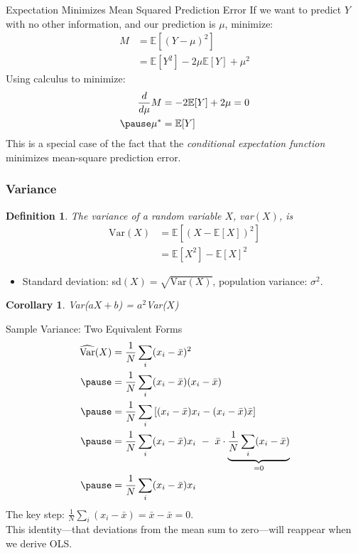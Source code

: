 \documentclass[aspectratio=169, handout, t]{beamer}
\newtheorem{defn}{Definition}
\newtheorem{cor}{Corollary}
\numberwithin{equation}{section}
\begin{document}
\begin{frame}{Expectation Minimizes Mean Squared Prediction Error}
If we want to predict $Y$ with no other information, and our prediction is $\mu$, minimize:
\begin{align*}
M &= \mathbb{E}[(Y-\mu)^2]\\
&=\mathbb{E}[Y^2]-2\mu \mathbb{E}[Y]+ \mu^2
\end{align*}\pause
Using calculus to minimize:\pause
\begin{align*}
\frac{d }{d \mu}M&=-2\mathbb{E}[Y]+ 2\mu = 0\\ \pause
\mu^*&=\mathbb{E}[Y]
\end{align*}\pause
This is a special case of the fact that the \emph{conditional expectation function} minimizes mean-square prediction error.
\end{frame}

\begin{frame}
\frametitle{Variance}

\begin{defn}
The variance of a random variable $X$, var$(X)$, is
\begin{align*}
 \text{Var}(X) &= \mathbb{E}[(X - \mathbb{E}[X])^2]  \\
 &=   \mathbb{E}[X^2] - \mathbb{E}[X]^2
\end{align*}
\end{defn}

\begin{itemize}
\item Standard deviation: sd$(X) = \sqrt{\text{Var}(X)} $, population variance: $\sigma^2$.
\end{itemize}

\begin{cor}
Var($aX  + b$)  = $a^2$Var($X$)
\end{cor}

\end{frame}



\begin{frame}{Sample Variance: Two Equivalent Forms}
\footnotesize
\begin{align*}
\widehat{\text{Var}}(X)&=\frac{1}{N}\sum_i(x_i-\bar{x})^2\\\pause
&=\frac{1}{N}\sum_i(x_i-\bar{x})(x_i-\bar{x})\\\pause
&=\frac{1}{N}\sum_i\left[(x_i-\bar{x})x_i-(x_i-\bar{x})\bar{x}\right]\\\pause
&=\frac{1}{N}\sum_i(x_i-\bar{x})x_i\ -\ \bar{x}\cdot\underbrace{\frac{1}{N}\sum_i(x_i-\bar{x})}_{=0}\\\pause
&=\frac{1}{N}\sum_i(x_i-\bar{x})x_i
\end{align*}\pause
\small
The key step: $\frac{1}{N}\sum_i(x_i-\bar{x})=\bar{x}-\bar{x}=0$.\\
This identity---that deviations from the mean sum to zero---will reappear when we derive OLS.
\end{frame}
\end{document}
